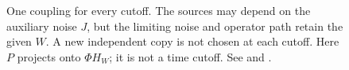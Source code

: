 \begin{figure}
  \centering
  
  \caption[The original and auxiliary Gaussian noises]{One coupling for every
    cutoff. The sources may depend on the auxiliary noise $J$, but the limiting
    noise and operator path retain the given $W$. A new independent copy is not
    chosen at each cutoff. Here $P$ projects onto $\Phi H_W$; it is not a time
    cutoff. See  and
    .}
  \label{Fig:common-noise}
\end{figure}
